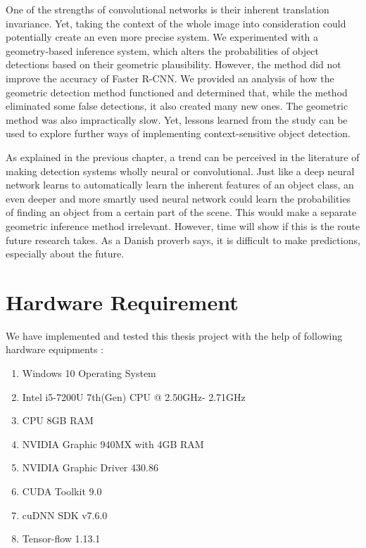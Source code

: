 One of the strengths of convolutional networks is their inherent translation invariance. Yet, taking the context of the whole image into consideration could potentially create an even more precise system. We experimented with a geometry-based inference system, which alters the probabilities of object detections based on their geometric plausibility. However, the method did not improve the accuracy of Faster R-CNN. We provided an analysis of how the geometric detection method functioned and determined that, while the method eliminated some false detections, it also created many new ones. The geometric method was also impractically slow. Yet, lessons learned from the study can be used to explore further ways of implementing context-sensitive object detection.

As explained in the previous chapter, a trend can be perceived in the literature of making detection systems wholly neural or convolutional. Just like a deep neural network learns to automatically learn the inherent features of an object class, an even deeper and more smartly used neural network could learn the probabilities of finding an object from a certain part of the scene. This would make a separate geometric inference method irrelevant. However, time will show if this is the route future research takes. As a Danish proverb says, it is difficult to make predictions, especially about the future.

\section{Hardware Requirement}
We have implemented and tested this thesis project with the help of  following hardware equipments :

\begin{enumerate}
	\setlength{\itemsep}{-0.3em}
	\item Windows 10 Operating System
	\item Intel i5-7200U 7th(Gen) CPU @ 2.50GHz- 2.71GHz
	\item CPU 8GB RAM
	\item NVIDIA Graphic 940MX with 4GB RAM
	\item NVIDIA Graphic Driver 430.86
	\item CUDA Toolkit 9.0
	\item cuDNN SDK v7.6.0
	\item Tensor-flow 1.13.1
\end{enumerate}

